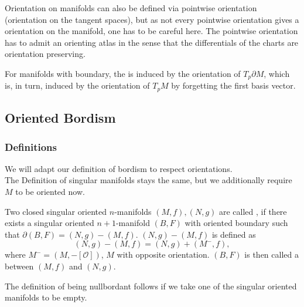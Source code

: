 \documentclass[a4paper,12pt]{article}
\begin{document}
\begin{remark}
    Orientation on manifolds can also be defined via pointwise orientation (orientation on the tangent spaces), but as not every pointwise orientation gives a orientation on the manifold, one has to be careful here. The pointwise orientation has to admit an orienting atlas in the sense that the differentials of the charts are orientation preserving.
\end{remark}

For manifolds with boundary, the  is induced by the orientation of \(T_p\partial M\), which is, in turn, induced by the orientation of \(T_p M\) by forgetting the first basis vector.



\subsection{Oriented Bordism}

\subsubsection{Definitions}

We will adapt our definition of bordism to respect orientations.\\
The Definition of singular manifolds stays the same, but we additionally require \(M\) to be oriented now.

\begin{definition}
    Two closed singular oriented \(n\)-manifolds \((M,f),(N,g)\) are called , if there exists a singular oriented \(n+1\)-manifold \((B,F)\) with oriented boundary such that \(\partial (B,F) = (N,g)-(M,f)\). \((N,g)-(M,f)\) is defined as
    \[(N,g)-(M,f)=(N,g)+(M^-,f),\]
    where \(M^-=(M,-[\mathcal{O}])\), \(M\) with opposite orientation. \((B,F)\) is then called a  between \((M,f)\) and \((N,g)\).
\end{definition}

\begin{remark}
    The definition of being nullbordant follows if we take one of the singular oriented manifolds to be empty.
\end{remark}
\end{document}
